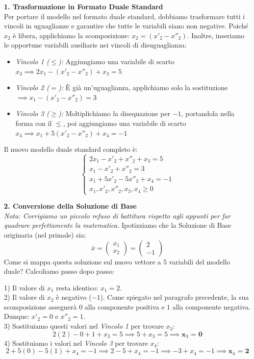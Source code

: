 \documentclass[12pt, a4paper]{article}
\begin{document}
	\textbf{1. Trasformazione in Formato Duale Standard}\\
	Per portare il modello nel formato duale standard, dobbiamo trasformare tutti i vincoli in uguaglianze e garantire che tutte le variabili siano non negative. 
	Poiché $x_2$ è libera, applichiamo la scomposizione: $x_2 = (x'_2 - x''_2)$.
	Inoltre, inseriamo le opportune variabili ausiliarie nei vincoli di disuguaglianza:
	\begin{itemize}[label=\textcolor{titlecolor}{\Large\textbullet}, itemsep=2pt, leftmargin=1.5cm]
		\item \textit{Vincolo 1 ($\leq$):} Aggiungiamo una variabile di scarto $x_3 \implies 2x_1 - (x'_2 - x''_2) + x_3 = 5$
		\item \textit{Vincolo 2 ($=$):} È già un'uguaglianza, applichiamo solo la sostituzione $\implies x_1 - (x'_2 - x''_2) = 3$
		\item \textit{Vincolo 3 ($\geq$):} Moltiplichiamo la disequazione per $-1$, portandola nella forma con il $\leq$, poi aggiungiamo una variabile di scarto $x_4 \implies x_1 + 5(x'_2 - x''_2) + x_4 = -1$
	\end{itemize}
	
	Il nuovo modello duale standard completo è:
	\[
	\begin{cases}
		2x_1 - x'_2 + x''_2 + x_3 = 5 \\
		x_1 - x'_2 + x''_2 = 3 \\
		x_1 + 5x'_2 - 5x''_2 + x_4 = -1 \\
		x_1, x'_2, x''_2, x_3, x_4 \geq 0
	\end{cases}
	\]
	
	\vspace{0.4cm}
	\textbf{2. Conversione della Soluzione di Base}\\
	\textit{Nota: Corrigiamo un piccolo refuso di battitura rispetto agli appunti per far quadrare perfettamente la matematica.} 
	Ipotizziamo che la Soluzione di Base originaria (nel primale) sia:
	\[
	\bar{x} = \begin{pmatrix} x_1 \\ x_2 \end{pmatrix} = \begin{pmatrix} 2 \\ -1 \end{pmatrix}
	\]
	Come si mappa questa soluzione sul nuovo vettore a 5 variabili del modello duale? Calcoliamo passo dopo passo:
	
	1) Il valore di $x_1$ resta identico: \textbf{$x_1 = 2$}.\\
	2) Il valore di $x_2$ è negativo ($-1$). Come spiegato nel paragrafo precedente, la sua scomposizione assegnerà $0$ alla componente positiva e $1$ alla componente negativa. Dunque: \textbf{$x'_2 = 0$} e \textbf{$x''_2 = 1$}.\\
	3) Sostituiamo questi valori nel \textit{Vincolo 1} per trovare $x_3$:
	\[ 2(2) - 0 + 1 + x_3 = 5 \implies 5 + x_3 = 5 \implies \textbf{x}_3 \textbf{ = 0} \]
	4) Sostituiamo i valori nel \textit{Vincolo 3} per trovare $x_4$:
	\[ 2 + 5(0) - 5(1) + x_4 = -1 \implies 2 - 5 + x_4 = -1 \implies -3 + x_4 = -1 \implies \textbf{x}_4 \textbf{ = 2} \]
	
\end{document}
